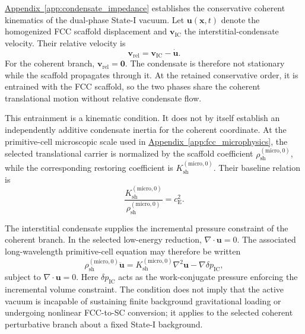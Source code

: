 \hyperref[app:condensate_impedance]{Appendix~\ref*{app:condensate_impedance}} establishes the conservative coherent kinematics of the dual-phase State-I vacuum. Let $\mathbf{u}(\mathbf{x},t)$ denote the homogenized FCC scaffold displacement and $\mathbf{v}_{\mathrm{IC}}$ the interstitial-condensate velocity. Their relative velocity is
\begin{equation}
    \mathbf{v}_{\mathrm{rel}} = \mathbf{v}_{\mathrm{IC}} - \dot{\mathbf{u}}.
\end{equation}
For the coherent branch, $\mathbf{v}_{\mathrm{rel}} = \mathbf{0}$. The condensate is therefore not stationary while the scaffold propagates through it. At the retained conservative order, it is entrained with the FCC scaffold, so the two phases share the coherent translational motion without relative condensate flow.

This entrainment is a kinematic condition. It does not by itself establish an independently additive condensate inertia for the coherent coordinate. At the primitive-cell microscopic scale used in \hyperref[app:fcc_microphysics]{Appendix~\ref*{app:fcc_microphysics}}, the selected translational carrier is normalized by the scaffold coefficient $\rho_{\mathrm{sh}}^{(\mathrm{micro},0)}$, while the corresponding restoring coefficient is $K_{\mathrm{sh}}^{(\mathrm{micro},0)}$. Their baseline relation is
\begin{equation}
    \frac{K_{\mathrm{sh}}^{(\mathrm{micro},0)}}{\rho_{\mathrm{sh}}^{(\mathrm{micro},0)}} = c_{\mathrm{E}}^{2}.
\end{equation}

The interstitial condensate supplies the incremental pressure constraint of the coherent branch. In the selected low-energy reduction, $\nabla \cdot \mathbf{u} = 0$. The associated long-wavelength primitive-cell equation may therefore be written
\begin{equation}
    \rho_{\mathrm{sh}}^{(\mathrm{micro},0)} \ddot{\mathbf{u}} = K_{\mathrm{sh}}^{(\mathrm{micro},0)} \nabla^{2}\mathbf{u} - \nabla\delta p_{\mathrm{IC}},
\end{equation}
subject to $\nabla \cdot \mathbf{u} = 0$. Here $\delta p_{\mathrm{IC}}$ acts as the work-conjugate pressure enforcing the incremental volume constraint. The condition does not imply that the active vacuum is incapable of sustaining finite background gravitational loading or undergoing nonlinear FCC-to-SC conversion; it applies to the selected coherent perturbative branch about a fixed State-I background.

